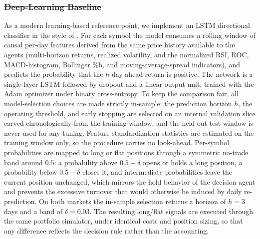 \documentclass{ieeeaccess}
\newcommand{\LSTMhorizon}{\ensuremath{3}}
\newcommand{\LSTMband}{\ensuremath{0.03}}
\providecommand{\DIFaddtex}[1]{{\protect\color{blue}\uwave{#1}}} %
\providecommand{\DIFdeltex}[1]{{\protect\color{red}\sout{#1}}}                      %
\providecommand{\DIFaddbegin}{} %
\providecommand{\DIFaddend}{} %
\providecommand{\DIFdelbegin}{} %
\providecommand{\DIFdelend}{} %
\providecommand{\DIFadd}[1]{\texorpdfstring{\DIFaddtex{#1}}{#1}} %
\providecommand{\DIFdel}[1]{\texorpdfstring{\DIFdeltex{#1}}{}} %
\newcommand{\DIFscaledelfig}{0.5}
\newlength{\DIFdelgraphicswidth} %
\newlength{\DIFdelgraphicsheight} %
\newcommand{\DIFaddincludegraphics}[2][]{{\color{blue}\fbox{\DIFOincludegraphics[#1]{#2}}}} %
\newcommand{\DIFdelincludegraphics}[2][]{%
\sbox{\DIFdelgraphicsbox}{\DIFOincludegraphics[#1]{#2}}%
\settoboxwidth{\DIFdelgraphicswidth}{\DIFdelgraphicsbox} %
\settoboxtotalheight{\DIFdelgraphicsheight}{\DIFdelgraphicsbox} %
\scalebox{\DIFscaledelfig}{%
\parbox[b]{\DIFdelgraphicswidth}{\usebox{\DIFdelgraphicsbox}\\[-\baselineskip] \rule{\DIFdelgraphicswidth}{0em}}\llap{\resizebox{\DIFdelgraphicswidth}{\DIFdelgraphicsheight}{%
\setlength{\unitlength}{\DIFdelgraphicswidth}%
\begin{picture}(1,1)%
\thicklines\linethickness{2pt} %
{\color[rgb]{1,0,0}\put(0,0){\framebox(1,1){}}}%
{\color[rgb]{1,0,0}\put(0,0){\line( 1,1){1}}}%
{\color[rgb]{1,0,0}\put(0,1){\line(1,-1){1}}}%
\end{picture}%
}\hspace*{3pt}}} %
} %
\DeclareRobustCommand{\DIFaddbegin}{\DIFOaddbegin \let\includegraphics\DIFaddincludegraphics} %
\DeclareRobustCommand{\DIFaddend}{\DIFOaddend \let\includegraphics\DIFOincludegraphics} %
\DeclareRobustCommand{\DIFdelbegin}{\DIFOdelbegin \let\includegraphics\DIFdelincludegraphics} %
\DeclareRobustCommand{\DIFdelend}{\DIFOaddend \let\includegraphics\DIFOincludegraphics} %
\begin{document}
\subsubsection{\DIFdelbegin \DIFdel{Deep-Learning Baseline}\DIFdelend \DIFaddbegin \DIFadd{Machine-Learning Baselines}\DIFaddend }
\label{subsec:lstm}
As a modern learning-based reference point, we implement an LSTM directional classifier in the style of \cite{fischerkrauss2018}. For each symbol the model consumes a rolling window of causal per-day features derived from the same price history available to the agents (multi-horizon returns, realized volatility, and the normalized RSI, ROC, MACD-histogram, Bollinger \%b, and moving-average-spread indicators), and predicts the probability that the $h$-day-ahead return is positive. The network is a single-layer LSTM followed by dropout and a linear output unit, trained with the Adam optimizer under binary cross-entropy. To keep the comparison fair, all model-selection choices are made strictly in-sample: the prediction horizon $h$, the operating threshold, and early stopping are selected on an internal validation slice carved chronologically from the training window, and the held-out test window is never used for any tuning. Feature standardization statistics are estimated on the training window only, so the procedure carries no look-ahead. Per-symbol probabilities are mapped to long or flat positions through a symmetric no-trade band around $0.5$: a probability above $0.5 + \delta$ opens or holds a long position, a probability below $0.5 - \delta$ closes it, and intermediate probabilities leave the current position unchanged, which mirrors the hold behavior of the decision agent and prevents the excessive turnover that would otherwise be induced by daily re-prediction. On both markets the in-sample selection returns a horizon of $h = \LSTMhorizon$ days and a band of $\delta = \LSTMband$. The resulting long/flat signals are executed through the same portfolio simulator, under identical costs and position sizing, so that any difference reflects the decision rule rather than the accounting.
\end{document}
